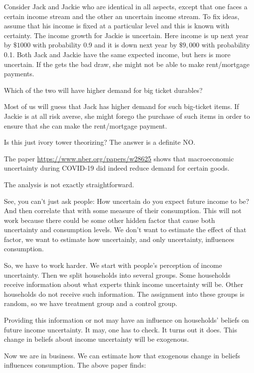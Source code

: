 \documentclass[
]{book}
\begin{document}
Consider Jack and Jackie who are identical in all aspects, except that one faces a certain income stream and the other an uncertain income stream. To fix ideas, assume that his income is fixed at a particular level and this is known with certainty. The income growth for Jackie is uncertain. Here income is up next year by \(\$1000\) with probability 0.9 and it is down next year by \(\$9,000\) with probability 0.1. Both Jack and Jackie have the same expected income, but hers is more uncertain. If the gets the bad draw, she might not be able to make rent/mortgage payments.

Which of the two will have higher demand for big ticket durables?

Most of us will guess that Jack has higher demand for such big-ticket items. If Jackie is at all risk averse, she might forego the purchase of such items in order to ensure that she can make the rent/mortgage payment.

Is this just ivory tower theorizing? The answer is a definite NO.

The paper \url{https://www.nber.org/papers/w28625} shows that macroeconomic uncertainty during COVID-19 did indeed reduce demand for certain goods.

The analysis is not exactly straightforward.

See, you can't just ask people: How uncertain do you expect future income to be? And then correlate that with some measure of their consumption. This will not work because there could be some other hidden factor that cause both uncertainty and consumption levels. We don't want to estimate the effect of that factor, we want to estimate how uncertainly, and only uncertainty, influences consumption.

So, we have to work harder. We start with people's perception of income uncertainty. Then we split households into several groups. Some households receive information about what experts think income uncertainty will be. Other households do not receive such information. The assignment into these groups is random, so we have treatment group and a control group.

Providing this information or not may have an influence on households' beliefs on future income uncertainty. It may, one has to check. It turns out it does. This change in beliefs about income uncertainty will be exogenous.

Now we are in business. We can estimate how that exogenous change in beliefs influences consumption. The above paper finds:
\end{document}
